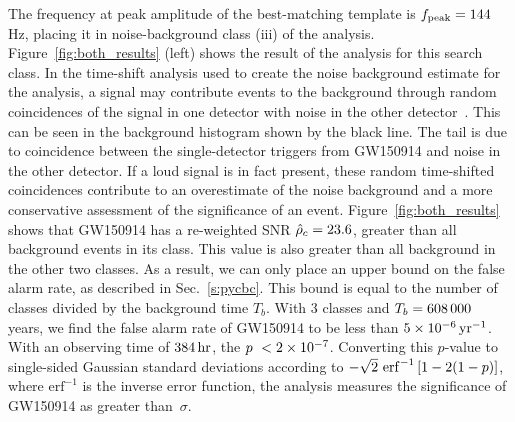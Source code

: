 The frequency at peak amplitude of the best-matching template is
$f_{\mathrm{peak}} = 144\,$Hz, placing it in
noise-background class (iii) of the \pycbc{} analysis.
Figure~\ref{fig:both_results} (left) shows the result of the \pycbc{} analysis
for this search class.  In the time-shift analysis used to create the noise
background estimate for the \pycbc{} analysis, a signal may contribute events
to the background through random coincidences of the signal in one
detector with noise in the other detector~\cite{Capano:2016uif}.  This can be
seen in the background histogram shown by the black line. The tail is due
to coincidence between the single-detector triggers from GW150914 and noise in
the other detector.  If a loud signal is in fact present, these random
time-shifted coincidences contribute to an overestimate of the noise
background and a more conservative assessment of the significance of an event.
Figure~\ref{fig:both_results} shows that GW150914 has a re-weighted SNR
$\hat{\rho}_c = 23.6$, greater than all background events in its
class. This value is also greater than all background in the other two
classes. As a result, we can only place an upper bound on the false alarm
rate, as described in Sec.~\ref{s:pycbc}. This bound is equal to the number of
classes divided by the background time $T_b$. With $3$ classes and $T_b =
608\,000$ years, we find the false alarm rate of GW150914 to be less
than $5 \times 10^{-6}\,\text{yr}^{-1}$. With an observing time of $384\,\mathrm{hr}$,
the $p~< 2\times 10^{-7}$.  Converting this
$p$-value to single-sided Gaussian standard deviations according
to $-\sqrt{2}\ \mathrm{erf}^{-1}\left[1 - 2(1-p)\right]$, where
$\mathrm{erf}^{-1}$ is the inverse error function, the \pycbc{} analysis
measures the significance of GW150914 as greater than \CBCEVENTSIGMA
$\,\sigma$. 
